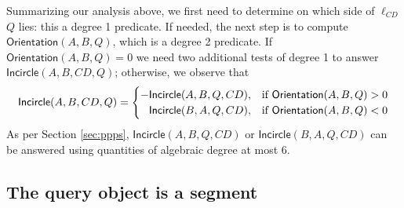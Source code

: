 \documentclass[letterpaper,11pt]{article}
\newcommand{\incircle}{\textsf{Incircle}\xspace}
\begin{document}
Summarizing our analysis above, we first need to determine on which
side of $\ell_{CD}$ $Q$ lies: this a degree 1 predicate. If needed,
the next step is to compute $\textsf{Orientation}(A,B,Q)$, which is a
degree 2 predicate. If $\textsf{Orientation}(A,B,Q)=0$ we need two
additional tests of degree 1 to answer $\incircle(A,B,CD,Q)$;
otherwise, we observe that
\begin{equation*}
\incircle(A,B,CD,Q)=\begin{cases}
    -\incircle(A,B,Q,CD),
    &\text{if\ }\textsf{Orientation}(A,B,Q)>0\\
    \textcolor{white}{-}\incircle(B,A,Q,CD),
    &\text{if\ }\textsf{Orientation}(A,B,Q)<0
  \end{cases}
\end{equation*}
As per Section \ref{sec:ppps}, $\incircle(A,B,Q,CD)$ or
$\incircle(B,A,Q,CD)$ can be answered using quantities of algebraic
degree at most 6. 





\subsection{The query object is a segment}\label{sec:ppss}
\end{document}
